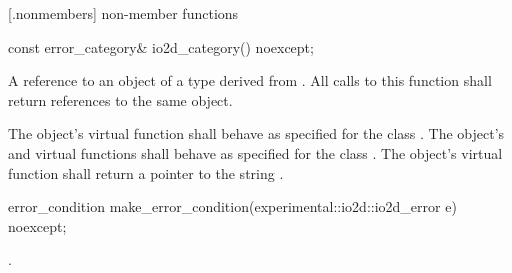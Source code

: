  [\iotwoderrorcategory.nonmembers] { 
non-member functions}

\begin{itemdecl}
  const error_category& io2d_category() noexcept;
\end{itemdecl}
\begin{itemdescr}
	\pnum
	\returns
	A reference to an object of a type derived from . All 
	calls to this function shall return references to the same object.
	
	\pnum
	\remarks
	The object's  virtual function shall behave 
	as specified for the class . The object's 
	 and  
	virtual functions shall behave as specified for the class 
	. The object's  virtual function 
	shall return a pointer to the string .
\end{itemdescr}

\begin{itemdecl}
  error_condition make_error_condition(experimental::io2d::io2d_error e) 
    noexcept;
\end{itemdecl}
\begin{itemdescr}
	\pnum
	\returns
	.
\end{itemdescr}
